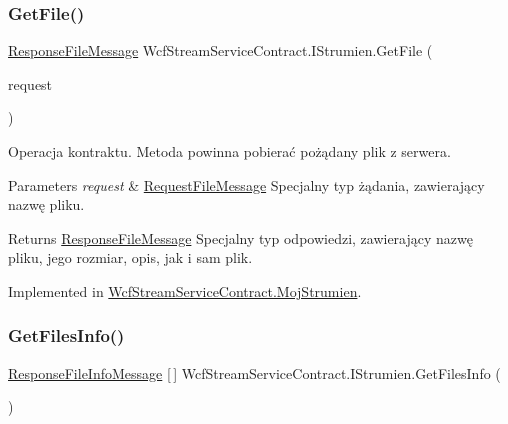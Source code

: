 \subsubsection{\texorpdfstring{Get\+File()}{GetFile()}}
{\footnotesize\ttfamily \hyperlink{class_wcf_stream_service_contract_1_1_response_file_message}{Response\+File\+Message} Wcf\+Stream\+Service\+Contract.\+I\+Strumien.\+Get\+File (\begin{DoxyParamCaption}\item[{\hyperlink{class_wcf_stream_service_contract_1_1_request_file_message}{Request\+File\+Message}}]{request }\end{DoxyParamCaption})}



Operacja kontraktu. Metoda powinna pobierać pożądany plik z serwera. 


\begin{DoxyParams}{Parameters}
{\em request} & \hyperlink{class_wcf_stream_service_contract_1_1_request_file_message}{Request\+File\+Message} Specjalny typ żądania, zawierający nazwę pliku.\\
\hline
\end{DoxyParams}
\begin{DoxyReturn}{Returns}
\hyperlink{class_wcf_stream_service_contract_1_1_response_file_message}{Response\+File\+Message} Specjalny typ odpowiedzi, zawierający nazwę pliku, jego rozmiar, opis, jak i sam plik.
\end{DoxyReturn}


Implemented in \hyperlink{class_wcf_stream_service_contract_1_1_moj_strumien_af4959737574f4dca1230d168dc5846e8}{Wcf\+Stream\+Service\+Contract.\+Moj\+Strumien}.

\mbox{\label{interface_wcf_stream_service_contract_1_1_i_strumien_ae0e59eb415597d2af101adaa7e33032d}} 
\subsubsection{\texorpdfstring{Get\+Files\+Info()}{GetFilesInfo()}}
{\footnotesize\ttfamily \hyperlink{class_wcf_stream_service_contract_1_1_response_file_info_message}{Response\+File\+Info\+Message} \mbox{[}$\,$\mbox{]} Wcf\+Stream\+Service\+Contract.\+I\+Strumien.\+Get\+Files\+Info (\begin{DoxyParamCaption}{ }\end{DoxyParamCaption})}



